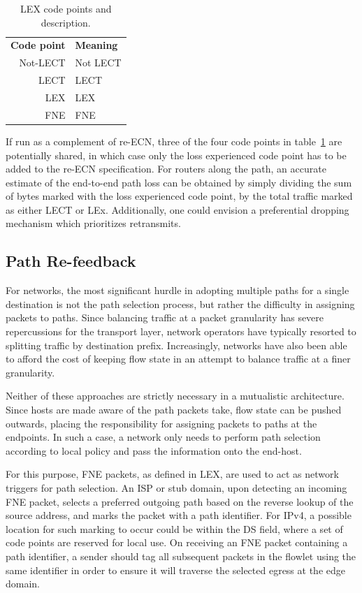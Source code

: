\begin{table}
\centering
\begin{tabular}{r|l}
    \textbf{Code point} & \textbf{Meaning} \\
    Not-\acs{LECT} & Not \acf{LECT} \\
    \acs{LECT} & \acf{LECT} \\
    \acs{LEX} & \acf{LEX} \\ 
    \acs{FNE} & \acf{FNE} \\
\end{tabular}
\caption{LEX code points and description.}
\label{table:codepoint}
\end{table}

If run as a complement of re-\ac{ECN}, three of the four code points in table~\ref{table:codepoint} are potentially shared, in which case only the loss experienced code point has to be added to the re-\ac{ECN} specification. For routers along the path, an accurate estimate of the end-to-end path loss can be obtained by simply dividing the sum of bytes marked with the loss experienced code point, by the total traffic marked as either \ac{LECT} or \ac{LEx}. Additionally, one could envision a preferential dropping mechanism which prioritizes retransmits.

\subsection{Path Re-feedback}

For networks, the most significant hurdle in adopting multiple paths for a single destination is not the path selection process, but rather the difficulty in assigning packets to paths. Since balancing traffic at a packet granularity has severe repercussions for the transport layer, network operators have typically resorted to splitting traffic by destination prefix. Increasingly, networks have also been able to afford the cost of keeping flow state in an attempt to balance traffic at a finer granularity. 

Neither of these approaches are strictly necessary in a mutualistic architecture. Since hosts are made aware of the path packets take, flow state can be pushed outwards, placing the responsibility for assigning packets to paths at the endpoints. In such a case, a network only needs to perform path selection according to local policy and pass the information onto the end-host.

For this purpose, \ac{FNE} packets, as defined in \ac{LEX}, are used to act as network triggers for path selection. 
An \ac{ISP} or stub domain, upon detecting an incoming \ac{FNE} packet, selects a preferred outgoing path based on the reverse lookup of the source address, and marks the packet with a path identifier. 
For \ac{IP}v4, a possible location for such marking to occur could be within the \ac{DS} field, where a set of code points are reserved for local use. 
On receiving an \ac{FNE} packet containing a path identifier, a sender should tag all subsequent packets in the flowlet using the same identifier in order to ensure it will traverse the selected egress at the edge domain.

